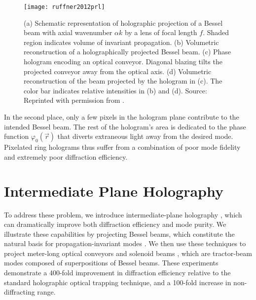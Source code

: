 \begin{figure}[t!]
  \centering
  \texttt{[image: ruffner2012prl]}
  \caption{(a) Schematic representation of holographic projection of a Bessel beam with axial wavenumber $\alpha k$ by a lens of focal length $f$. Shaded region indicates volume of invariant propagation. (b) Volumetric reconstruction of a holographically projected Bessel beam. (c) Phase hologram encoding an optical conveyor. Diagonal blazing tilts the projected conveyor away from the optical axis. (d) Volumetric reconstruction of the beam projected by the hologram in (c). The color bar indicates relative intensities in (b) and (d). Source: Reprinted with permission from \cite{ruffner12a}.}
  \label{fig:previous bessel hologram}
\end{figure}


In the second place, only a few pixels in
the hologram plane contribute to the intended Bessel beam.
The rest of the hologram's area is dedicated to the
phase function $\varphi_0(\vec{r})$ that diverts
extraneous light away from the desired mode.
Pixelated ring holograms thus suffer from a combination of
poor mode fidelity and extremely poor diffraction efficiency.






\section{Intermediate Plane Holography}


To address these problem, we introduce intermediate-plane
holography \cite{Mondal:18}, which can dramatically improve
both diffraction efficiency and mode purity.
We illustrate these capabilities by projecting
Bessel beams, which constitute 
the natural basis for propagation-invariant modes \cite{durnin87,durnin87a}.
We then use these techniques to project meter-long
optical conveyors \cite{cizmar05,ruffner12a,ruffner14}
and solenoid beams \cite{lee10,yevick16}, 
which are tractor-beam modes composed of superpositions of Bessel
beams.
These experiments demonstrate a \num{400}-fold improvement in 
diffraction efficiency relative to the standard holographic optical
trapping technique, and a
\num{100}-fold increase in non-diffracting range.


